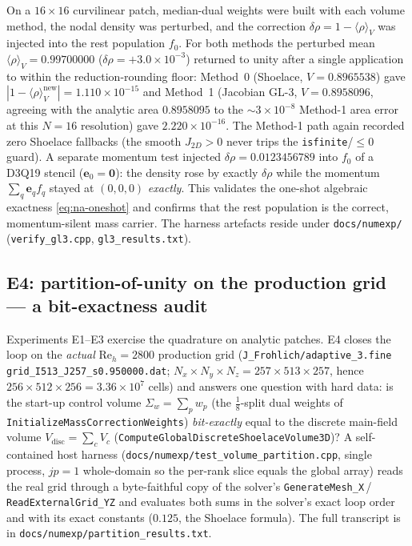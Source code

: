 \documentclass[11pt]{article}
\theoremstyle{definition}
\theoremstyle{remark}
\providecommand{\path}[1]{\texttt{#1}}
\begin{document}
On a $16\times16$ curvilinear patch, median-dual weights were built with each
volume method, the nodal density was perturbed, and the correction
$\delta\rho=1-\langle\rho\rangle_V$ was injected into the rest population $f_0$.
For both methods the perturbed mean $\langle\rho\rangle_V=0.99700000$
($\delta\rho=+3.0\times10^{-3}$) returned to unity after a single application to
within the reduction-rounding floor: Method~0 (Shoelace, $V=0.8965538$) gave
$|1-\langle\rho\rangle_V^{\mathrm{new}}|=1.110\times10^{-15}$ and Method~1 (Jacobian
GL-3, $V=0.8958096$, agreeing with the analytic area $0.8958095$ to the
$\sim\!3\times10^{-8}$ Method-1 area error at this $N{=}16$ resolution) gave
$2.220\times10^{-16}$. The Method-1 path again recorded zero Shoelace fallbacks (the
smooth $J_{2D}>0$ never trips the \texttt{isfinite}/${\le}0$ guard). A separate
momentum test injected $\delta\rho=0.0123456789$ into $f_0$ of a D3Q19 stencil
($\mathbf e_0=\mathbf0$): the density rose by exactly $\delta\rho$ while the momentum
$\sum_q\mathbf e_q f_q$ stayed at $(0,0,0)$ \emph{exactly}. This validates the
one-shot algebraic exactness \eqref{eq:na-oneshot} and confirms that the rest
population is the correct, momentum-silent mass carrier. The harness artefacts reside
under \path{docs/numexp/} (\path{verify_gl3.cpp}, \path{gl3_results.txt}).

\subsection{E4: partition-of-unity on the production grid --- a bit-exactness audit}
\label{sec:E4}

Experiments E1--E3 exercise the quadrature on analytic patches. E4 closes the
loop on the \emph{actual} $\mathrm{Re}_h{=}2800$ production grid
(\path{J_Frohlich/adaptive_3.fine grid_I513_J257_s0.950000.dat};
$N_x{\times}N_y{\times}N_z=257{\times}513{\times}257$, hence
$256{\times}512{\times}256=3.36\times10^{7}$ cells) and answers one question with
hard data: is the start-up control volume $\Sigma_w=\sum_p w_p$ (the
$\tfrac18$-split dual weights of \texttt{InitializeMassCorrectionWeights})
\emph{bit-exactly} equal to the discrete main-field volume
$V_{\mathrm{disc}}=\sum_c V_c$ (\texttt{ComputeGlobalDiscreteShoelaceVolume3D})?
A self-contained host harness (\path{docs/numexp/test_volume_partition.cpp},
single process, $jp{=}1$ whole-domain so the per-rank slice equals the global
array) reads the real grid through a byte-faithful copy of the solver's
\texttt{GenerateMesh\_X}\,/\,\texttt{ReadExternalGrid\_YZ} and evaluates both sums
in the solver's exact loop order and with its exact constants ($0.125$, the
Shoelace formula). The full transcript is in
\path{docs/numexp/partition_results.txt}.
\end{document}

